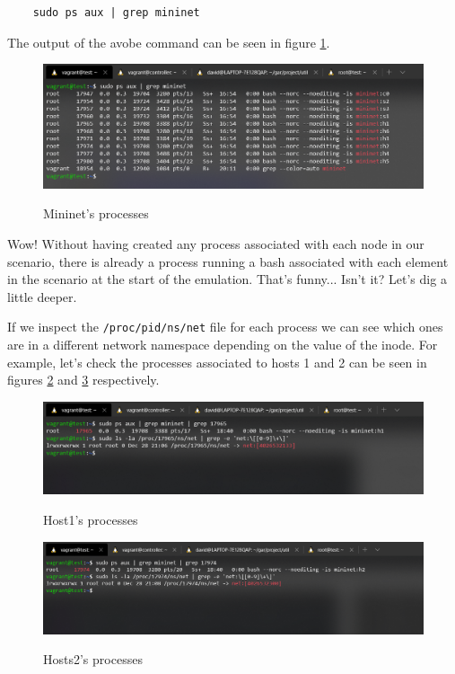 \documentclass[12pt]{article}
\newcommand{\newpar} {
    \vskip 1cm
}
\begin{document}
			\begin{verbatim}
	sudo ps aux | grep mininet
			\end{verbatim}

			The output of the avobe command can be seen in figure \ref{f:netns_procs}.

			\begin{figure}[!htb]
				\centering
				\includegraphics[width=\linewidth]{netns_procs.png}
				\label{f:netns_procs}
				\caption{Mininet's processes}
			\end{figure}

			Wow! Without having created any process associated with each node in our scenario, there is already a process running a bash associated with each element in the scenario at the start of the emulation. That's funny... Isn't it? Let's dig a little deeper.
			\newpar
			If we inspect the \texttt{/proc/{pid}/ns/net} file for each process we can see which ones are in a different network namespace depending on the value of the inode. For example, let's check the processes associated to hosts 1 and 2 can be seen in figures \ref{f:host1_procs} and \ref{f:host2_procs} respectively.

			\begin{figure}[!htb]
				\centering
				\includegraphics[width=\linewidth]{host1_procs.png}
				\label{f:host1_procs}
				\caption{Host1's processes}
			\end{figure}

			\begin{figure}[!htb]
				\centering
				\includegraphics[width=\linewidth]{host2_procs.png}
				\label{f:host2_procs}
				\caption{Hosts2's processes}
			\end{figure}
\end{document}
